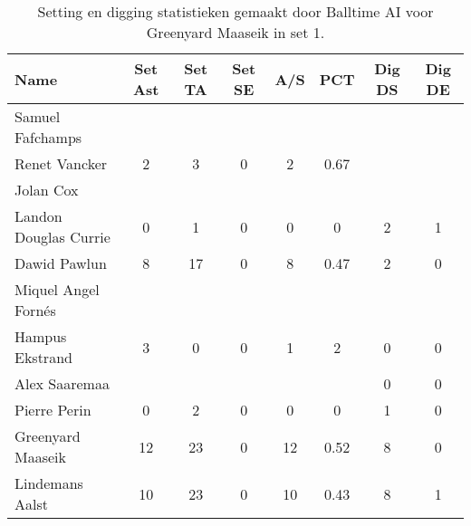 \begin{table}[ht!]
  \centering
  \scriptsize
  \begin{tabular}{|l|c|c|c|c|c|c|c|} \hline
    \textbf{Name} & Set Ast & Set TA & Set SE & A/S & PCT & Dig DS & Dig DE \\ \hline
    Samuel Fafchamps &   &   &   &   &   &   &   \\
    Renet Vancker & 2 & 3 & 0 & 2 & 0.67 &   &   \\
    Jolan Cox &   &   &   &   &   &   &   \\
    Landon Douglas Currie & 0 & 1 & 0 & 0 & 0 & 2 & 1 \\
    Dawid Pawlun & 8 & 17 & 0 & 8 & 0.47 & 2 & 0 \\
    Miquel Angel Fornés &   &   &   &   &   &   &   \\
    Hampus Ekstrand & 3 & 0 & 0 & 1 & 2 & 0 & 0 \\
    Alex Saaremaa &   &   &   &   &   & 0 & 0 \\
    Pierre Perin & 0 & 2 & 0 & 0 & 0 & 1 & 0 \\
    Greenyard Maaseik & 12 & 23 & 0 & 12 & 0.52 & 8 & 0 \\
    Lindemans Aalst & 10 & 23 & 0 & 10 & 0.43 & 8 & 1 \\ \hline
  \end{tabular}
  \caption[Setting en digging statistieken gemaakt door Balltime AI voor Greenyard Maaseik in set 1]{\label{tab:PL3SetDigMaaseik1}Setting en digging statistieken gemaakt door Balltime AI voor Greenyard Maaseik in set 1.}
\end{table}


